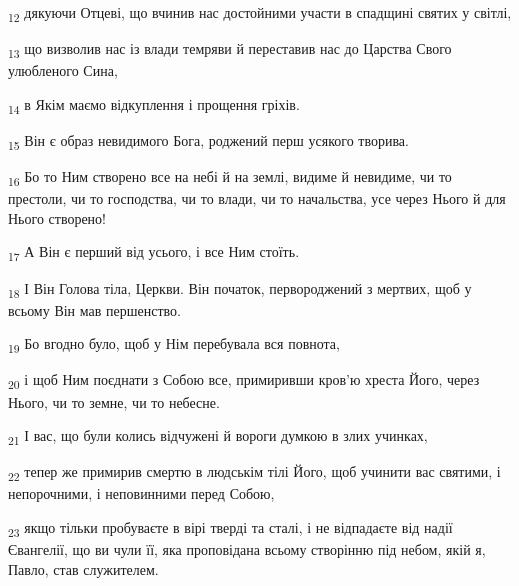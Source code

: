 \begin{tcolorbox}
\textsubscript{12} дякуючи Отцеві, що вчинив нас достойними участи в спадщині святих у світлі,
\end{tcolorbox}
\begin{tcolorbox}
\textsubscript{13} що визволив нас із влади темряви й переставив нас до Царства Свого улюбленого Сина,
\end{tcolorbox}
\begin{tcolorbox}
\textsubscript{14} в Якім маємо відкуплення і прощення гріхів.
\end{tcolorbox}
\begin{tcolorbox}
\textsubscript{15} Він є образ невидимого Бога, роджений перш усякого творива.
\end{tcolorbox}
\begin{tcolorbox}
\textsubscript{16} Бо то Ним створено все на небі й на землі, видиме й невидиме, чи то престоли, чи то господства, чи то влади, чи то начальства, усе через Нього й для Нього створено!
\end{tcolorbox}
\begin{tcolorbox}
\textsubscript{17} А Він є перший від усього, і все Ним стоїть.
\end{tcolorbox}
\begin{tcolorbox}
\textsubscript{18} І Він Голова тіла, Церкви. Він початок, первороджений з мертвих, щоб у всьому Він мав першенство.
\end{tcolorbox}
\begin{tcolorbox}
\textsubscript{19} Бо вгодно було, щоб у Нім перебувала вся повнота,
\end{tcolorbox}
\begin{tcolorbox}
\textsubscript{20} і щоб Ним поєднати з Собою все, примиривши кров'ю хреста Його, через Нього, чи то земне, чи то небесне.
\end{tcolorbox}
\begin{tcolorbox}
\textsubscript{21} І вас, що були колись відчужені й вороги думкою в злих учинках,
\end{tcolorbox}
\begin{tcolorbox}
\textsubscript{22} тепер же примирив смертю в людськім тілі Його, щоб учинити вас святими, і непорочними, і неповинними перед Собою,
\end{tcolorbox}
\begin{tcolorbox}
\textsubscript{23} якщо тільки пробуваєте в вірі тверді та сталі, і не відпадаєте від надії Євангелії, що ви чули її, яка проповідана всьому створінню під небом, якій я, Павло, став служителем.
\end{tcolorbox}
